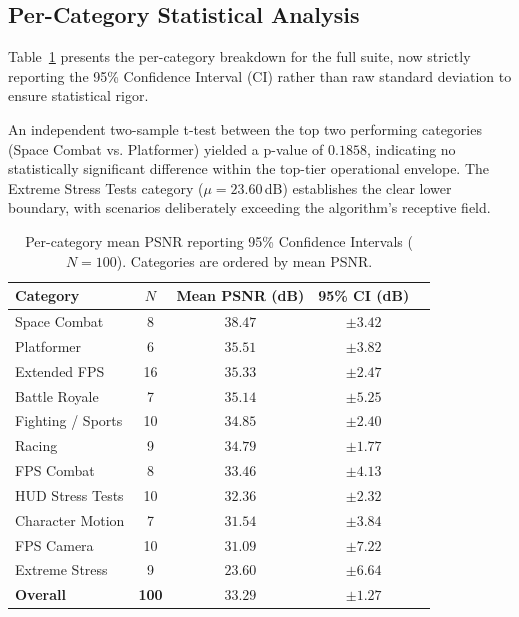 \documentclass{article}
\begin{document}
\subsection{Per-Category Statistical Analysis}

Table~\ref{tab:categories} presents the per-category breakdown for the full suite, now strictly reporting the 95\% Confidence Interval (CI) rather than raw standard deviation to ensure statistical rigor.

An independent two-sample t-test between the top two performing categories (Space Combat vs. Platformer) yielded a p-value of $0.1858$, indicating no statistically significant difference within the top-tier operational envelope. The Extreme Stress Tests category ($\mu = 23.60$\,dB) establishes the clear lower boundary, with scenarios deliberately exceeding the algorithm's receptive field.

\begin{table}[t]
    \centering
    \caption{Per-category mean PSNR reporting 95\% Confidence Intervals ($N=100$). Categories are ordered by mean PSNR.}
    \label{tab:categories}
    \small
    \begin{tabular}{@{}lcccc@{}}
    \toprule
    \textbf{Category} & $N$ & \textbf{Mean PSNR (dB)} & \textbf{95\% CI (dB)} \\
    \midrule
    Space Combat         &  8 & $38.47$ & $\pm 3.42$ \\
    Platformer           &  6 & $35.51$ & $\pm 3.82$ \\
    Extended FPS         & 16 & $35.33$ & $\pm 2.47$ \\
    Battle Royale        &  7 & $35.14$ & $\pm 5.25$ \\
    Fighting / Sports    & 10 & $34.85$ & $\pm 2.40$ \\
    Racing               &  9 & $34.79$ & $\pm 1.77$ \\
    FPS Combat           &  8 & $33.46$ & $\pm 4.13$ \\
    HUD Stress Tests     & 10 & $32.36$ & $\pm 2.32$ \\
    Character Motion     &  7 & $31.54$ & $\pm 3.84$ \\
    FPS Camera           & 10 & $31.09$ & $\pm 7.22$ \\
    Extreme Stress       &  9 & $23.60$ & $\pm 6.64$ \\
    \midrule
    \textbf{Overall}     & \textbf{100} & $\mathbf{33.29}$ & $\mathbf{\pm 1.27}$ \\
    \bottomrule
    \end{tabular}
\end{table}
\end{document}
